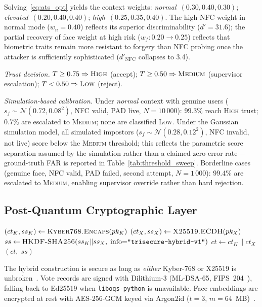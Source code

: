 \documentclass[conference]{IEEEtran}
\begin{document}
Solving~\eqref{eq:ats_opt} yields the context weights:
\textit{normal}~\((0.30, 0.40, 0.30)\);
\textit{elevated}~\((0.20, 0.40, 0.40)\);
\textit{high}~\((0.25, 0.35, 0.40)\).
The high NFC weight in normal mode (\(w_n{=}0.40\)) reflects its superior
discriminability (\(d'{=}31.6\)); the partial recovery of face weight at
high risk (\(w_f: 0.20\!\to\!0.25\)) reflects that biometric traits remain
more resistant to forgery than NFC probing once the attacker is
sufficiently sophisticated (\(d'_{\mathrm{NFC}}\) collapses to 3.4).

\textit{Trust decision.} \(T \geq 0.75\Rightarrow\textsc{High}\) (accept);
\(T \geq 0.50\Rightarrow\textsc{Medium}\) (supervisor escalation);
\(T < 0.50\Rightarrow\textsc{Low}\) (reject).

\textit{Simulation-based calibration.}
Under \textit{normal} context with genuine users
(\(s_f \sim \mathcal{N}(0.72,0.08^2)\), NFC valid, PAD live,
\(N{=}10\,000\)): 99.3\% reach \textsc{High} trust; 0.7\% are escalated
to \textsc{Medium}; none are classified \textsc{Low}.
Under the Gaussian simulation model, all simulated impostors
(\(s_f \sim \mathcal{N}(0.28,0.12^2)\), NFC invalid, not live)
score below the \textsc{Medium} threshold; this reflects the parametric
score separation assumed by the simulation rather than a
claimed zero-error rate—ground-truth FAR is reported in
Table~\ref{tab:threshold_sweep}.
Borderline cases (genuine face, NFC valid, PAD failed, second attempt,
\(N{=}1\,000\)): 99.4\% are escalated to \textsc{Medium}, enabling
supervisor override rather than hard rejection.

\subsection{Post-Quantum Cryptographic Layer}
\label{sec:pqc}

\begin{algorithm}[t]
\caption{TRIsecure HybridKEM.Encapsulate(\(pk\))}
\begin{algorithmic}[1]
  \State \((ct_K, ss_K) \gets \textsc{Kyber768.Encaps}(pk_K)\)
  \State \((ct_X, ss_X) \gets \textsc{X25519.ECDH}(pk_X)\)
  \State \(ss \gets \textsc{HKDF-SHA256}(ss_K \| ss_X,\;
    \text{info}{=}\texttt{"trisecure-hybrid-v1"})\)
  \State \(ct \gets ct_K \| ct_X\)
  \State \Return \((ct,\; ss)\)
\end{algorithmic}
\end{algorithm}

The hybrid construction is secure as long as \emph{either} Kyber-768 or
X25519 is unbroken~\cite{bernstein2017post}. Vote records are signed with
Dilithium-3 (ML-DSA-65, FIPS~204~\cite{nist_fips204}), falling back to
Ed25519 when \texttt{liboqs-python} is unavailable. Face embeddings are
encrypted at rest with AES-256-GCM keyed via Argon2id (\(t{=}3\),
\(m{=}64\)~MB)~\cite{biryukov2015argon2}.
\end{document}

